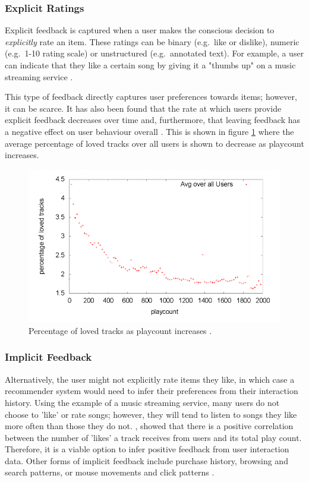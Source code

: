 \subsubsection{Explicit Ratings}
Explicit feedback is captured when a user makes the conscious decision to \textit{explicitly} rate an item. These ratings can be binary (e.g.\ like or dislike), numeric (e.g.\ 1-10 rating scale) or unstructured (e.g.\ annotated text). For example, a user can indicate that they like a certain song by giving it a "thumbs up" on a music streaming service \parencite{cf_1.5_explicit}.

This type of feedback directly captures user preferences towards items; however, it can be scarce. It has also been found that the rate at which users provide explicit feedback decreases over time and, furthermore, that leaving feedback has a negative effect on user behaviour overall \parencite{cf_1.5_explicit}. This is shown in figure \ref{fig:playcount} where the average percentage of loved tracks over all users is shown to decrease as playcount increases.

\begin{figure}[H]
\centering
\includegraphics[width=13cm]{Figures/2_2_playcount-vs-loved.png}
\decoRule
\caption[Playcount-loved]{Percentage of loved tracks as playcount increases \parencite{cf_1.5_explicit}.}
\label{fig:playcount}
\end{figure}

\subsubsection{Implicit Feedback}
Alternatively, the user might not explicitly rate items they like, in which case a recommender system would need to infer their preferences from their interaction history. Using the example of a music streaming service, many users do not choose to 'like' or rate songs; however, they will tend to listen to songs they like more often than those they do not. \cite{cf_1.5_explicit}, showed that there is a positive correlation between the number of 'likes' a track receives from users and its total play count. Therefore, it is a viable option to infer positive feedback from user interaction data. Other forms of implicit feedback include purchase history, browsing and search patterns, or mouse movements and click patterns \parencite{handbook_1.5_cf}.

